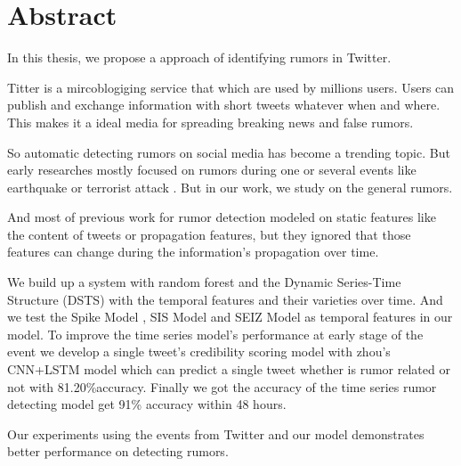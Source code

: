 
\chapter{Abstract}
 
In this thesis, we propose a approach of identifying rumors in Twitter. 

Titter is a mircoblogiging service that which are used by millions users. Users can publish and exchange information with short tweets whatever when and where. This makes it a ideal media for spreading breaking news and false rumors.  

So automatic detecting rumors on social media has become a trending topic. But early researches mostly focused on rumors during one or several events like earthquake or terrorist attack \cite{oh2010exploration} \cite{tanaka2012transmission}\cite{starbird2014rumors}. But in our work, we study on the general rumors.

And most of previous work for rumor detection modeled on static features like the content of tweets or propagation features, but they ignored that those features can change during the information's propagation over time.

We build up a system with random forest and the Dynamic Series-Time Structure (DSTS) \cite{ma2015detect} with the temporal features and their varieties over time. And we test the Spike Model \cite{kwon2013prominent}, SIS Model and SEIZ Model  \cite{jin2013epidemiological} as temporal features in our model. To improve the time series model's performance at early stage of the event we develop a single tweet's credibility scoring model with zhou's CNN+LSTM model \cite{zhou2015c} which can predict a single tweet whether is rumor related or not with 81.20\%accuracy. Finally we got the accuracy of the time series rumor detecting model get 91\% accuracy within 48 hours. 

 Our experiments using the events from Twitter and our model demonstrates better performance on detecting rumors.



